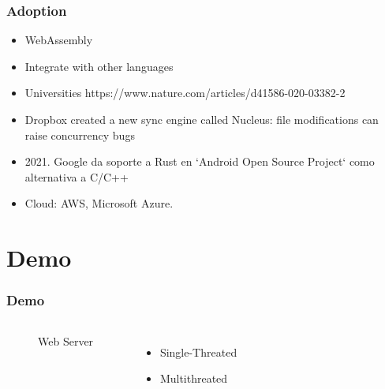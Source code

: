 \documentclass{beamer}
\begin{document}
\begin{frame}
\frametitle{Adoption}
\begin{itemize}
\item WebAssembly
\item Integrate with other languages
\item Universities https://www.nature.com/articles/d41586-020-03382-2
\item Dropbox created a new sync engine called Nucleus: file modifications can raise concurrency bugs
\item 2021. Google da soporte a Rust en `Android Open Source Project` como alternativa a C/C++
\item Cloud: AWS, Microsoft Azure.
\end{itemize}

\end{frame}

\section{Demo}

\begin{frame}
\frametitle{Demo}

\begin{columns}[c] %

  \begin{figure}
    \centering
  \caption{Web Server}
  \end{figure}

\begin{itemize}
\item Single-Threated
\item Multithreated
\end{itemize}

\end{columns}

\end{frame}
\end{document}
